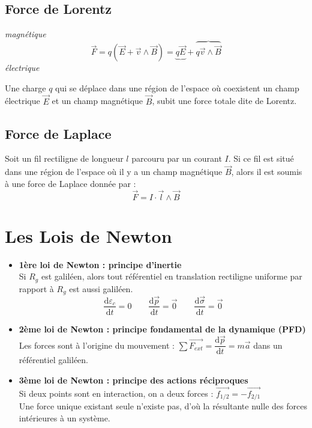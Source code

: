\documentclass[a4paper,12pt]{article}
\newcommand{\diff}{\mathrm{d}} %
\renewcommand{\vec}{\overrightarrow}  %
\begin{document}
\begin{multicols}{2}
        \subsection{Force de Lorentz}
            \hspace{5.3cm} \textit{magnétique}
            $$ \vec{F} = q(\vec{E} + \vec{v} \wedge \vec{B}) = \underbrace{q\vec{E}} + \overbrace{q \vec{v} \wedge \vec{B}} $$
            \hspace{4.5cm} \textit{électrique}

            Une charge $q$ qui se déplace dans une région de l'espace où coexistent 
            un champ électrique $\vec{E}$ et un champ magnétique $\vec{B}$, subit une force 
            totale dite de Lorentz.

        \subsection{Force de Laplace}
            Soit un fil rectiligne de longueur $l$ parcouru par un 
            courant $I$. Si ce fil est situé dans une région de 
            l'espace où il y a un champ magnétique $\vec{B}$, alors il 
            est soumis à une force de Laplace donnée par :
            $$ \vec{F} = I \cdot \vec{l} \wedge \vec{B} $$
    
    \end{multicols}

    \section{Les Lois de Newton}

        \begin{itemize}[label=$\bullet$]
            \item \textbf{1ère loi de Newton : principe d'inertie}\\
            Si $R_g$ est galiléen, alors tout référentiel en translation
            rectiligne uniforme par rapport à $R_g$ est aussi galiléen.
                $$ \frac{\diff \varepsilon_c}{\diff t} = 0 \quad\quad \frac{\diff \vec{p}}{\diff t} = \vec{0} \quad\quad \frac{\diff \vec{\sigma}}{\diff t} = \vec{0} $$

            \item \textbf{2ème loi de Newton : principe fondamental de la dynamique (PFD)} \\
            Les forces sont à l'origine du mouvement : $\sum \vec{F_{ext}} = \dfrac{\diff \vec p}{\diff t} = m \vec{a}$ dans un référentiel galiléen.

            \item \textbf{3ème loi de Newton : principe des actions réciproques} \\
            Si deux points sont en interaction, on a deux forces : $\vec{f_{1/2}} = - \vec{f_{2/1}}$\\
            Une force unique existant seule n'existe pas, d'où la résultante nulle des forces intérieures à un système.
        \end{itemize}
\end{document}
